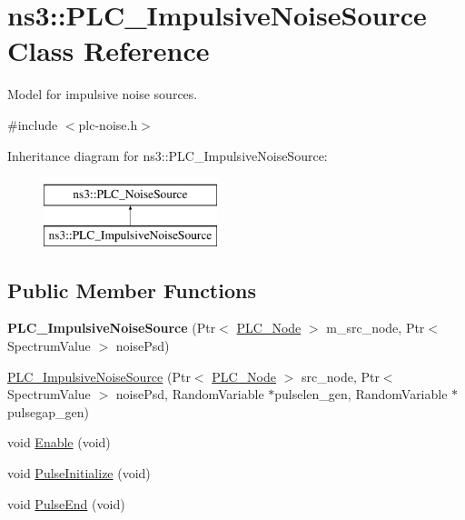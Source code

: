 \hypertarget{classns3_1_1PLC__ImpulsiveNoiseSource}{\section{ns3\-:\-:\-P\-L\-C\-\_\-\-Impulsive\-Noise\-Source \-Class \-Reference}
\label{classns3_1_1PLC__ImpulsiveNoiseSource}
}


\-Model for impulsive noise sources.  




{\ttfamily \#include $<$plc-\/noise.\-h$>$}

\-Inheritance diagram for ns3\-:\-:\-P\-L\-C\-\_\-\-Impulsive\-Noise\-Source\-:\begin{figure}[H]
\begin{center}
\leavevmode
\includegraphics[height=2.000000cm]{classns3_1_1PLC__ImpulsiveNoiseSource}
\end{center}
\end{figure}
\subsection*{\-Public \-Member \-Functions}
\begin{DoxyCompactItemize}
\item 
\hypertarget{classns3_1_1PLC__ImpulsiveNoiseSource_a4c7278ed0a96d2edd86759474fe95524}{{\bfseries \-P\-L\-C\-\_\-\-Impulsive\-Noise\-Source} (\-Ptr$<$ \hyperlink{classns3_1_1PLC__Node}{\-P\-L\-C\-\_\-\-Node} $>$ m\-\_\-src\-\_\-node, \-Ptr$<$ \-Spectrum\-Value $>$ noise\-Psd)}\label{classns3_1_1PLC__ImpulsiveNoiseSource_a4c7278ed0a96d2edd86759474fe95524}

\item 
\hyperlink{classns3_1_1PLC__ImpulsiveNoiseSource_ab62fc890eaf1caa48b74563d9e9a9a7a}{\-P\-L\-C\-\_\-\-Impulsive\-Noise\-Source} (\-Ptr$<$ \hyperlink{classns3_1_1PLC__Node}{\-P\-L\-C\-\_\-\-Node} $>$ src\-\_\-node, \-Ptr$<$ \-Spectrum\-Value $>$ noise\-Psd, \-Random\-Variable $\ast$pulselen\-\_\-gen, \-Random\-Variable $\ast$pulsegap\-\_\-gen)
\item 
void \hyperlink{classns3_1_1PLC__ImpulsiveNoiseSource_ab0f6587b0abb04afcebf6d9a1407a833}{\-Enable} (void)
\item 
void \hyperlink{classns3_1_1PLC__ImpulsiveNoiseSource_a63a45910cd88be1b20ac9875f4a8fe20}{\-Pulse\-Initialize} (void)
\item 
void \hyperlink{classns3_1_1PLC__ImpulsiveNoiseSource_af90f96c556fc3abff99d1ccee2fd8da6}{\-Pulse\-End} (void)
\end{DoxyCompactItemize}
